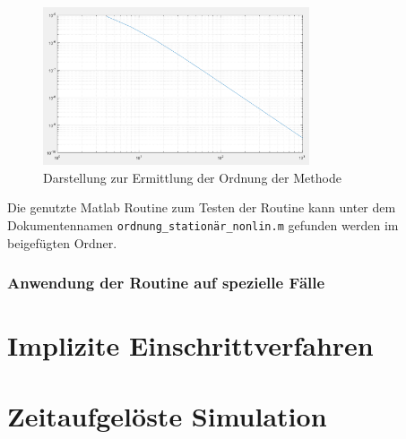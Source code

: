 \documentclass[
	pagesize,
	fontsize=12pt,
	paper=a4,
	oneside,
   reqno
]{scrartcl}
\begin{document}
\begin{figure}[H]
   \centering
   \includegraphics[width=0.7\textwidth]{Bilder/Aufgabe_2_2_6_b.png}
   \caption[Ordnung der Methode nichtlinear stationär]{Darstellung zur Ermittlung der Ordnung der Methode}
   \label{fig:Aufgabe_2_2_6_b}
\end{figure}

Die genutzte Matlab Routine zum Testen der Routine kann unter dem Dokumentennamen \texttt{ordnung\_stationär\_nonlin.m} gefunden werden im beigefügten Ordner.

\subsubsection{Anwendung der Routine auf spezielle Fälle}

\clearpage

\section{Implizite Einschrittverfahren} \label{sec:ImpliziteEinschrittverfahren}

\clearpage

\section{Zeitaufgelöste Simulation} \label{sec:ZeitaufgeloesteSimulation}

\clearpage

\newpage
\newcount\Quellennummer
{}

\renewcommand\refname{Literaturverzeichnis}
\end{document}
